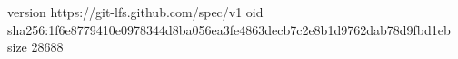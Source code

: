 version https://git-lfs.github.com/spec/v1
oid sha256:1f6e8779410e0978344d8ba056ea3fe4863decb7c2e8b1d9762dab78d9fbd1eb
size 28688
